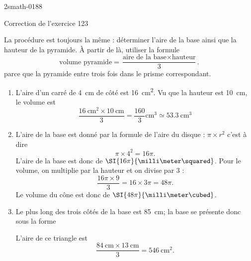 
\begin{corrige}{2smath-0188}

\begin{center}
    Correction de l'exercice 123
\end{center}

La procédure est toujours la même : déterminer l'aire de la base ainsi que la hauteur de la pyramide. À partir de là, utiliser la formule
\begin{equation}
    \text{volume pyramide}=\frac{ \text{aire de la base}\times \text{hauteur} }{ 3 }.
\end{equation}
parce que la pyramide entre trois fois dans le prisme correspondant.
\begin{enumerate}
    \item
        L'aire d'un carré de \SI{4}{\centi\meter} de côté est \SI{16}{\centi\meter\squared}. Vu que la hauteur est \SI{10}{\centi\meter}, le volume est
        \begin{equation}
            \frac{ \SI{16}{\centi\meter\squared}\times \SI{10}{\centi\meter} }{ 3 }=\frac{ 160 }{ 3 }\si{\centi\meter\cubed}\simeq \SI{53.3}{\centi\meter\cubed}
        \end{equation}
    \item
        L'aire de la base est donné par la formule de l'aire du disque : \( \pi\times r^2\) c'est à dire
        \begin{equation}
            \pi\times 4^2=16\pi.
        \end{equation}
        L'aire de la base est donc de \( \SI{16\pi}{\milli\meter\squared}\). Pour le volume, on multiplie par la hauteur et on divise par \( 3\) :
        \begin{equation}
            \frac{ 16\pi\times 9 }{ 3 }=16\times 3\pi=48\pi.
        \end{equation}
        Le volume du cône est donc de \( \SI{48\pi}{\milli\meter\cubed}\).
    \item
        Le plus long des trois côtés de la base est \SI{85}{\centi\meter}; la base se présente donc sous la forme
        \begin{center}
            
        \end{center}
        L'aire de ce triangle est 
        \begin{equation}
            \frac{ \SI{84}{\centi\meter}\times \SI{13}{\centi\meter} }{ 3 }=\SI{546}{\centi\meter\squared}.
        \end{equation}


\end{enumerate}
\end{corrige}
